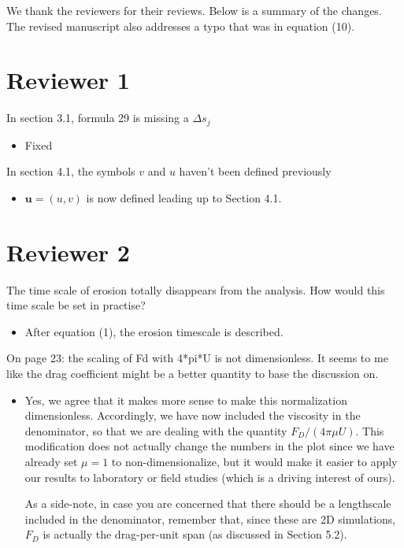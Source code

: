 \documentclass[11pt]{article}
\newcommand{\comment}[1]{{\color{blue} #1}}
\begin{document}
\noindent
We thank the reviewers for their reviews.  Below is a summary of the
changes.  The revised manuscript also addresses a typo that was in
equation (10).

\section*{Reviewer 1}

\noindent
\comment{In section 3.1, formula 29 is missing a $\Delta s_{j}$}
\begin{itemize}
  \item Fixed
\end{itemize}

\noindent
\comment{In section 4.1, the symbols $v$ and $u$ haven't been defined
previously}
\begin{itemize}
  \item $\mathbf{u} = (u,v)$ is now defined leading up to Section 4.1.
\end{itemize}



\section*{Reviewer 2}
\noindent
\comment{The time scale of erosion totally disappears from the analysis.
How would this time scale be set in practise?}
\begin{itemize}
  \item After equation (1), the erosion timescale is described.
\end{itemize}

\noindent
\comment{On page 23: the scaling of Fd with 4*pi*U is not dimensionless.
It seems to me like the drag coefficient might be a better quantity to
base the discussion on.}
\begin{itemize}
\item Yes, we agree that it makes more sense to make this normalization dimensionless.  Accordingly, we have now included the viscosity in the denominator, so that we are dealing with the quantity $F_D /(4 \pi \mu U)$. This modification does not actually change the numbers in the plot since we have already set $\mu =1$ to non-dimensionalize, but it would make it easier to apply our results to laboratory or field studies (which is a driving interest of ours).

As a side-note, in case you are concerned that there should be a lengthscale included in the denominator, remember that, since these are 2D simulations, $F_D$ is actually the drag-per-unit span (as discussed in Section 5.2).
\end{itemize}
\end{document}
